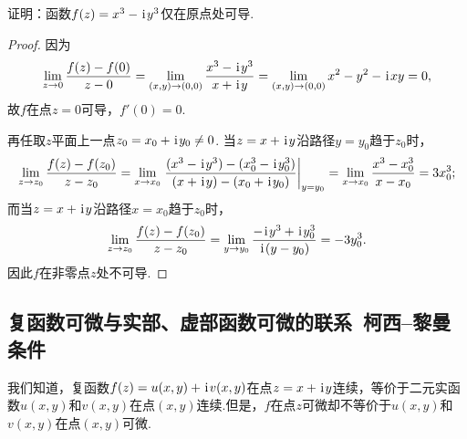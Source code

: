 \begin{example}
证明：函数\(f(z) = x^3 - \kern1pt\mathrm{i}\kern1pt y^3\)仅在原点处可导.
\begin{proof}
因为\begin{equation*}
\lim_{z\to0} \frac{f(z) - f(0)}{z - 0}
= \lim_{(x,y)\to(0,0)} \frac{x^3 - \kern1pt\mathrm{i}\kern1pt y^3}{x + \kern1pt\mathrm{i}\kern1pt y}
= \lim_{(x,y)\to(0,0)} x^2 - y^2 - \kern1pt\mathrm{i}\kern1pt xy
= 0,
\end{equation*}故\(f\)在点\(z = 0\)可导，\(f'(0) = 0\).

再任取\(z\)平面上一点\(z_0 = x_0 + \kern1pt\mathrm{i}\kern1pt y_0 \neq 0\).
当\(z = x + \kern1pt\mathrm{i}\kern1pt y\)沿路径\(y = y_0\)趋于\(z_0\)时，\begin{equation*}
\lim_{z \to z_0} \frac{f(z) - f(z_0)}{z - z_0}
= \lim_{x \to x_0} \eval{\frac{(x^3 - \iu y^3) - (x_0^3 - \iu y_0^3)}{(x + \iu y) - (x_0 + \iu y_0)}}_{y = y_0}
= \lim_{x \to x_0} \frac{x^3 - x_0^3}{x - x_0}
= 3 x_0^3;
\end{equation*}而当\(z = x + \kern1pt\mathrm{i}\kern1pt y\)沿路径\(x = x_0\)趋于\(z_0\)时，\begin{equation*}
\lim_{z \to z_0} \frac{f(z) - f(z_0)}{z - z_0}
= \lim_{y \to y_0} \frac{-\kern1pt\mathrm{i}\kern1pt y^3 + \kern1pt\mathrm{i}\kern1pt y_0^3}{\kern1pt\mathrm{i}\kern1pt (y - y_0)}
= -3 y_0^3.
\end{equation*}因此\(f\)在非零点\(z\)处不可导.
\end{proof}
\end{example}

\subsection{复函数可微与实部、虚部函数可微的联系\ 柯西--黎曼条件}
我们知道，复函数\(f(z)=u(x,y)+\kern1pt\mathrm{i}\kern1pt v(x,y)\)在点\(z=x+\kern1pt\mathrm{i}\kern1pt y\)连续，等价于二元实函数\(u(x,y)\)和\(v(x,y)\)在点\((x,y)\)连续.但是，\(f\)在点\(z\)可微却不等价于\(u(x,y)\)和\(v(x,y)\)在点\((x,y)\)可微.

